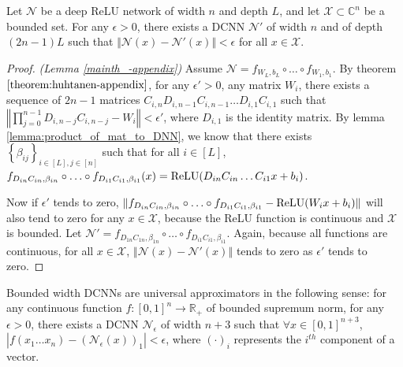\begin{lemma}\label{mainth_-appendix}
Let $\mathcal{N}$ be a deep ReLU network of width $n$ and depth $L$, and let $\mathcal{X} \subset \mathbb{C}^{n}$ be a bounded set. For any $\epsilon > 0$, there exists a DCNN $\mathcal{N}'$ of width $n$ and of depth $(2n-1)L$ such that $\Vert \mathcal{N}(x) - \mathcal{N}'(x) \Vert < \epsilon$ for all $x \in \mathcal{X}$.
\end{lemma}

\begin{proof} \emph{(Lemma \ref{mainth_-appendix})}
Assume $\mathcal{N}=f_{W_{L},b_{L}} \circ \ldots \circ f_{W_{1},b_{1}}$.
By theorem $\text{\ref{theorem:huhtanen-appendix}}$, for any $\epsilon '> 0$, any matrix $W_{i}$, there exists a sequence of $2n-1$ matrices $C_{i,n} D_{i,n-1} C_{i,n-1}\ldots D_{i,1}C_{i,1}$ such that $\left\Vert\prod_{j=0}^{n-1}D_{i,n-j}C_{i,n-j}-W_{i}\right\Vert<\epsilon'$, where $D_{i,1}$ is the identity matrix.
By lemma \ref{lemma:product_of_mat_to_DNN}, we know that there exists $\left\{ \beta_{ij}\right\} _{i\in[L],j\in[n]}$ such that for all $i\in[L]$, $f_{D_{in}C_{in},\beta_{in}} \circ \ldots \circ f_{D_{i1}C_{i1},\beta_{i1}}(x) = \relu \left(D_{in}C_{in}\ldots C_{i1}x+b_{i}\right)$.

Now if $\epsilon'$ tends to zero, $\left\Vert f_{D_{in}C_{in},\beta_{in}} \circ \ldots \circ f_{D_{i1}C_{i1},\beta_{i1}} - \relu \left(W_{i}x+b_{i}\right)\right\Vert $ will also tend to zero for any $x\in\mathcal{X}$, because the ReLU
function is continuous and $\mathcal{X}$ is bounded.
Let $\mathcal{N}' = f_{D_{1n}C_{1n},\beta_{1n}} \circ \ldots \circ f_{D_{i1}C_{i1},\beta_{i1}}$.
Again, because all functions are continuous, for all $x\in\mathcal{X}$, $\left\Vert \mathcal{N}(x)-\mathcal{N}'(x)\right\Vert $ tends to zero as $\epsilon'$ tends to zero.
\end{proof}

\begin{corollary} \label{cor:universal-appendix}
Bounded width DCNNs are universal approximators in the following sense: for any continuous function $f:[0,1]^{n}\rightarrow\mathbb{R}_+$ of bounded supremum norm,
for any $\epsilon>0$, there exists a DCNN
$\mathcal{N}_{\epsilon}$ of width $n+3$ such that $\forall x\in[0,1]^{n+3}$, $\left|f(x_{1}\ldots x_{n})-\left(\mathcal{N}_{\epsilon}\left(x\right)\right)_{1}\right|<\epsilon$, where $\left(\cdot\right)_{i}$ represents the $i^{th}$ component of a vector.
\end{corollary}

